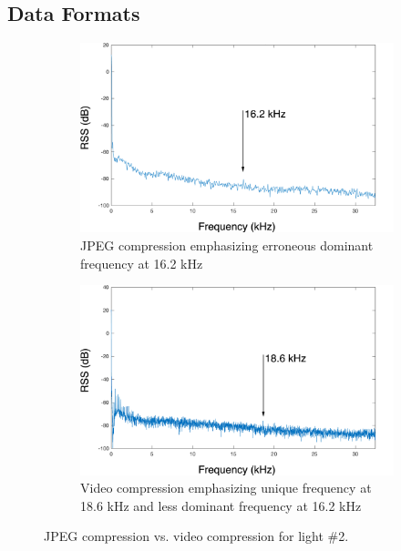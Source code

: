 \documentclass[conference]{IEEEtran}
\begin{document}
\subsection{Data Formats}

\begin{figure}[!h]
	\begin{subfigure}{.5\textwidth}
		\centering
		\includegraphics[width=1\linewidth]{figures/E/jpegs.png}
		\caption{JPEG compression emphasizing erroneous dominant frequency at 16.2 kHz}
	\end{subfigure}
	\begin{subfigure}{.5\textwidth}
		\centering
		\includegraphics[width=1\linewidth]{figures/E/video.png}
		\caption{Video compression emphasizing unique frequency at 18.6 kHz and less dominant frequency at 16.2 kHz}
	\end{subfigure}
	\caption{JPEG compression vs. video compression for light \#2.}
	\label{fig:compressioncomparison}
\end{figure}
\end{document}
